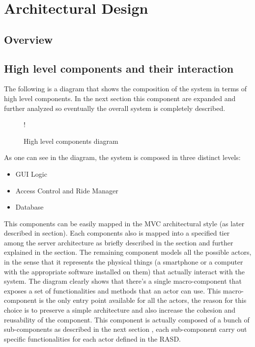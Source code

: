 \section{Architectural Design}
\subsection{Overview}
\label{sec:overview}
\subsection{High level components and their interaction}
\label{sec:high-level}
The following is a diagram that shows the composition of the system in terms of high level components. \newline
In the next section this component are expanded and further analyzed so eventually the overall system is completely described.
\begin{figure}[H]
	\centering
	\resizebox{6in}
	{!}{}
	\caption{High level components diagram}
\end{figure}
As one can see in the diagram, the system is composed in three distinct levels:
\begin{itemize}
	\item GUI Logic
	\item Access Control and Ride Manager
	\item Database
\end{itemize}
This components can be easily mapped in the MVC architectural style (as later described in  section).
Each components also is mapped into a specified tier among the server architecture as briefly described in the  section and further explained in the  section.
The remaining component models all the possible actors, in the sense that it represents the physical things (a smartphone or a computer with the appropriate software installed on them) that actually interact with the system. \newline
The diagram clearly shows that there's a single macro-component that exposes a set of functionalities and methods that an actor can use. This macro-component is the only entry point available for all the actors, the reason for this choice is to preserve a simple architecture and also increase the cohesion and reusability of the component. \newline
This component is actually composed of a bunch of sub-components as described in the next section , each sub-component carry out specific functionalities for each actor defined in the RASD.
